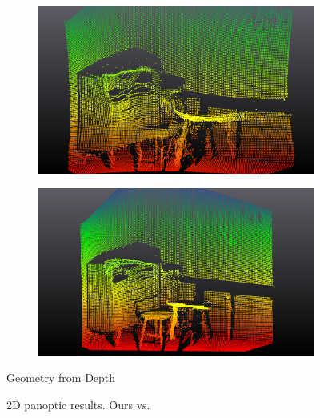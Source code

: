 \begin{figure}[t]
  \vspace{0.04\linewidth} %

  \begin{subfigure}{0.45\linewidth}
    \centering
    \includegraphics[width=\linewidth]{figs/depthply_ours.png}
    \label{subfig:sub3}
  \end{subfigure}
  \hspace{0.05\linewidth} %
  \begin{subfigure}{0.45\linewidth}
    \centering
    \includegraphics[width=\linewidth]{figs/depthply_pan.png}
    \label{subfig:sub4}
  \end{subfigure}
   \vspace*{-3mm} %
   \caption*{Geometry from Depth}

  \caption{2D panoptic results. Ours vs. \citet{dahnert2021panoptic}}
  \label{fig:qual_panoptic}
\end{figure}